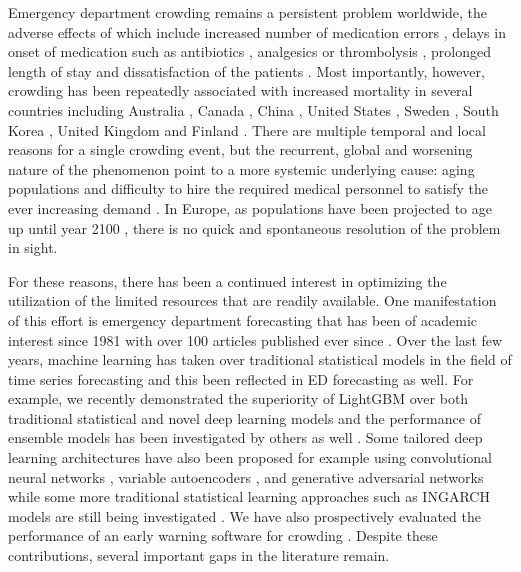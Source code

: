 Emergency department crowding remains a persistent problem worldwide, the adverse effects of which include increased number of medication errors \cite{Kulstad2010}, delays in onset of medication such as antibiotics \cite{Pines2007}, analgesics \cite{Pines2008} or thrombolysis \cite{Schull2003}, prolonged length of stay \cite{McCarthy2009} and dissatisfaction of the patients \cite{Boudreaux2000, Sun2000}. Most importantly, however, crowding has been repeatedly associated with increased mortality in several countries including Australia \cite{Richardson2006}, Canada \cite{Guttmann2011}, China \cite{Zhang2019}, United States \cite{Sun2013}, Sweden \cite{Ugglas2021}, South Korea \cite{Jo2014}, United Kingdom \cite{Jones2022} and Finland \cite{Eidsto2023}. There are multiple temporal and local reasons for a single crowding event, but the recurrent, global and worsening nature of the phenomenon point to a more systemic underlying cause: aging populations and difficulty to hire the required medical personnel to satisfy the ever increasing demand \cite{Morley2018}. In Europe, as populations have been projected to age up until year 2100 \cite{eurostat}, there is no quick and spontaneous resolution of the problem in sight.

For these reasons, there has been a continued interest in optimizing the utilization of the limited resources that are readily available. One manifestation of this effort is emergency department forecasting that has been of academic interest since 1981 \cite{Diehl1981} with over 100 articles published ever since \cite{Gul2018}. Over the last few years, machine learning has taken over traditional statistical models in the field of time series forecasting \cite{Makridakis2022, Makridakis2020} and this been reflected in ED forecasting as well. For example, we recently demonstrated the superiority of LightGBM over both traditional statistical and novel deep learning models \cite{Tuominen2024} and the performance of ensemble models has been investigated by others as well \cite{Petsis2022, Alvarez2023}. Some tailored deep learning architectures have also been proposed for example using convolutional neural networks \cite{Sharafat2021}, variable autoencoders \cite{Harrou2020}, and generative adversarial networks \cite{Kadri2023} while some more traditional statistical learning approaches such as INGARCH models are still being investigated \cite{Reboredo2023}. We have also prospectively evaluated the performance of an early warning software for crowding \cite{Tuominen2023}. Despite these contributions, several important gaps in the literature remain.

